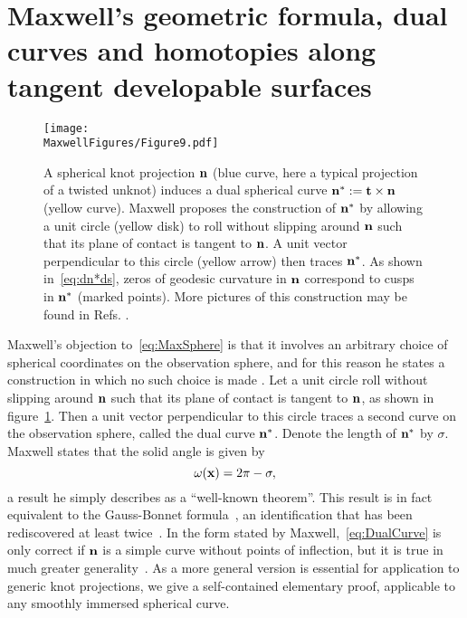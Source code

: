     \section{Maxwell's geometric formula, dual curves and homotopies along tangent developable surfaces }
    \label{sec:GaussBonnet}
    \begin{figure}
        \centering
        \texttt{[image: \\MaxwellFigures/Figure9.pdf]}
        \caption[The dual curve construction.]{A spherical knot projection $\bf n$ (blue curve, here a typical projection of a twisted unknot) induces a dual spherical curve ${\bf n}^* := {\bf t} \times {\bf n}$ (yellow curve). Maxwell proposes the construction of ${\bf n}^*$ by allowing a unit circle (yellow disk) to roll without slipping around $\bf n$ such that its plane of contact is tangent to $\bf n$. A unit vector perpendicular to this circle (yellow arrow) then traces ${\bf n}^*$. As shown in~\eqref{eq:dn*ds}, zeros of geodesic curvature in $\bf n$ correspond to cusps in $\bf n^*$ (marked points). More pictures of this construction may be found in Refs. \citep{Levi1994,Arnold1995}.   }
        \label{fig:DualCurve} 
    \end{figure}
    Maxwell's objection to~\eqref{eq:MaxSphere} is that it involves an arbitrary choice of spherical coordinates on the observation sphere, and for this reason he states a construction in which no such choice is made \citep[Art.~418]{Maxwell2}. Let a unit circle roll without slipping around ${\bf n}$ such that its plane of contact is tangent to $\bf n$, as shown in figure~\ref{fig:DualCurve}. Then a unit vector perpendicular to this circle traces a second curve on the observation sphere, called the dual curve ${\bf n}^*$. Denote the length of ${\bf n}^*$ by $\sigma$. Maxwell states that the solid angle is given by 
    \begin{equation}
        \omega({\bf x}) = 2\pi - \sigma ,
        \label{eq:DualCurve}
    \end{equation}
    a result he simply describes as a ``well-known theorem''. This result is in fact equivalent to the Gauss-Bonnet formula~\citep{Lee1996}, an identification that has been rediscovered at least twice~\citep{Levi1994,Arnold1995}. In the form stated by Maxwell,~\eqref{eq:DualCurve} is only correct if ${\bf n}$ is a simple curve without points of inflection, but it is true in much greater generality~\citep{Arnold1995}. As a more general version is essential for application to generic knot projections, we give a self-contained elementary proof, applicable to any smoothly immersed spherical curve. 

